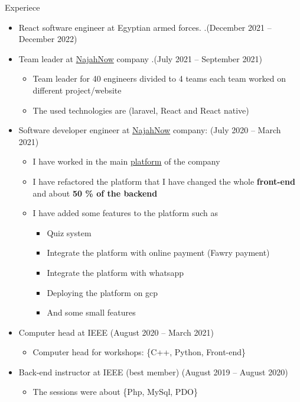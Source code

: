 \documentclass{resume}
\begin{document}
\begin{rSection}{Experiece}
    \begin{itemize}
        \item React software engineer at Egyptian armed forces. .\hfill{(December 2021 – December 2022)}
        \item Team leader at \href{https://najahnow.net}{NajahNow} company .\hfill{(July 2021 – September 2021)}
        \begin{itemize}
            \item Team leader for 40 engineers divided to 4 teams each team worked on different project/website
            \item The used technologies are (laravel, React and React native)
        \end{itemize}
        
        \item Software developer engineer at \href{https://najahnow.net}{NajahNow} company: \hfill{(July 2020 – March 2021)}
        \begin{itemize}
            \item I have worked in the main \href{https://najahnow.net}{platform} of the company
            \item I have refactored the platform that I have changed the whole \textbf{front-end} and about \textbf{50 \% of the backend}
            \item I have added some features to the platform such as 
            \begin{itemize}
                \item Quiz system 
                \item Integrate the platform with online payment (Fawry payment)
                \item Integrate the platform with whatsapp 
                \item Deploying the platform on gcp
                \item And some small features
            \end{itemize}
        \end{itemize}

        \item Computer head at IEEE \hfill{(August 2020 – March 2021)}
        \begin{itemize}
            \item Computer head for workshops: \{C++, Python, Front-end\}
        \end{itemize}
        \item Back-end instructor at IEEE (best member) \hfill{(August 2019 – August 2020)}
        \begin{itemize}
            \item The sessions were about \{Php, MySql, PDO\}
        \end{itemize}
    \end{itemize}
\end{rSection}
\end{document}
